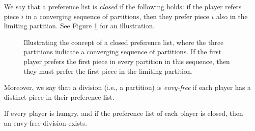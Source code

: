 \documentclass[letterpaper, reqno,12pt]{article}
\begin{document}
We say that a preference list is \emph{closed} if the following holds: if the player refers piece $i$ in a converging sequence of partitions, then they prefer piece $i$ also in the limiting partition. See Figure \ref{fig:closed} for an illustration.

\begin{figure}[h]
  \centering
  \caption{Illustrating the concept of a closed preference list, where the three partitions indicate a converging sequence of partitions. If the first player prefers the first piece in every partition in this sequence, then they must prefer the first piece in the limiting partition.}
  \label{fig:closed}
\end{figure}

Moreover, we say that a division (i.e., a partition) is \emph{envy-free} if each player has a distinct piece in their preference list.

\begin{theorem}[Su, 1980]
  If every player is hungry, and if the preference list of each player is closed, then an envy-free division exists.
\end{theorem}
\end{document}
